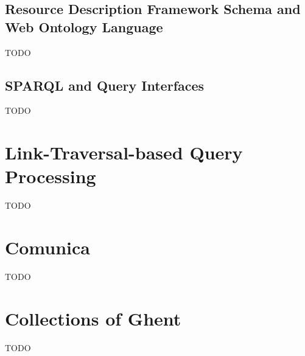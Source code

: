\subsection{Resource Description Framework Schema and Web Ontology Language}
\label{subsec:rdfs_owl}

TODO

\subsection{SPARQL and Query Interfaces}
\label{subsec:sparql}

TODO

\section{Link-Traversal-based Query Processing}
\label{sec:ltqp}

TODO

\section{Comunica}
\label{sec:comunica}

TODO

\section{Collections of Ghent}
\label{sec:coghent}

TODO